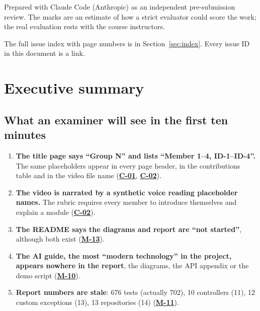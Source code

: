\documentclass[11pt,a4paper]{article}
\newcommand{\iref}[1]{\hyperref[iss:#1]{\textbf{#1}}}
\begin{document}
\begin{titlepage}
\vspace{10pt}
\begin{center}
\end{center}
\vfill
{\small\color{muted}Prepared with Claude Code (Anthropic) as an independent pre-submission review. The marks are an
estimate of how a strict evaluator could score the work; the real evaluation rests with the course instructors.}
\end{titlepage}

\tableofcontents
\vspace{8pt}
{\small\color{muted}The full issue index with page numbers is in Section~\ref{sec:index}. Every issue ID in this document is a link.}
\newpage

\section{Executive summary}

\subsection{What an examiner will see in the first ten minutes}
\begin{enumerate}[leftmargin=1.6em]
\item \textbf{The title page says ``Group N'' and lists ``Member 1--4, ID-1--ID-4''.} The same placeholders appear in
  every page header, in the contributions table and in the video file name (\iref{C-01}, \iref{C-02}).
\item \textbf{The video is narrated by a synthetic voice reading placeholder names.} The rubric requires every member
  to introduce themselves and explain a module (\iref{C-02}).
\item \textbf{The README says the diagrams and report are ``not started''}, although both exist (\iref{M-13}).
\item \textbf{The AI guide, the most ``modern technology'' in the project, appears nowhere in the report}, the diagrams,
  the API appendix or the demo script (\iref{M-10}).
\item \textbf{Report numbers are stale}: 676 tests (actually 702), 10 controllers (11), 12 custom exceptions (13),
  13 repositories (14) (\iref{M-11}).
\end{enumerate}
\end{document}
